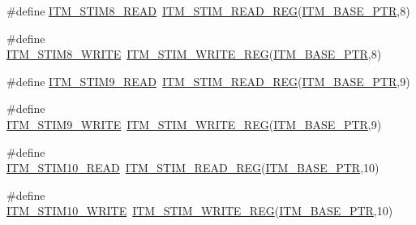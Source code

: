 \begin{DoxyCompactItemize}
\item 
\#define \hyperlink{group___i_t_m___register___accessor___macros_ga84e344ea9bb6dd044130f918d1cd3f59}{I\+T\+M\+\_\+\+S\+T\+I\+M8\+\_\+\+R\+E\+AD}~\hyperlink{group___i_t_m___register___accessor___macros_ga5009882336aadcd4f37b45cf3395c450}{I\+T\+M\+\_\+\+S\+T\+I\+M\+\_\+\+R\+E\+A\+D\+\_\+\+R\+EG}(\hyperlink{group___i_t_m___peripheral_gafaddee8fe8b6a898d4e5edc43ee0d703}{I\+T\+M\+\_\+\+B\+A\+S\+E\+\_\+\+P\+TR},8)
\item 
\#define \hyperlink{group___i_t_m___register___accessor___macros_ga90288fe5645ad72d65bcf25a4e48cc23}{I\+T\+M\+\_\+\+S\+T\+I\+M8\+\_\+\+W\+R\+I\+TE}~\hyperlink{group___i_t_m___register___accessor___macros_ga049ca92a4e78e77c19af81e51aa73f1c}{I\+T\+M\+\_\+\+S\+T\+I\+M\+\_\+\+W\+R\+I\+T\+E\+\_\+\+R\+EG}(\hyperlink{group___i_t_m___peripheral_gafaddee8fe8b6a898d4e5edc43ee0d703}{I\+T\+M\+\_\+\+B\+A\+S\+E\+\_\+\+P\+TR},8)
\item 
\#define \hyperlink{group___i_t_m___register___accessor___macros_ga1c080ae3f53ea5063b86fd6fe6ba264d}{I\+T\+M\+\_\+\+S\+T\+I\+M9\+\_\+\+R\+E\+AD}~\hyperlink{group___i_t_m___register___accessor___macros_ga5009882336aadcd4f37b45cf3395c450}{I\+T\+M\+\_\+\+S\+T\+I\+M\+\_\+\+R\+E\+A\+D\+\_\+\+R\+EG}(\hyperlink{group___i_t_m___peripheral_gafaddee8fe8b6a898d4e5edc43ee0d703}{I\+T\+M\+\_\+\+B\+A\+S\+E\+\_\+\+P\+TR},9)
\item 
\#define \hyperlink{group___i_t_m___register___accessor___macros_gaff1a7b2832a1e4ecef1e171dd126fc48}{I\+T\+M\+\_\+\+S\+T\+I\+M9\+\_\+\+W\+R\+I\+TE}~\hyperlink{group___i_t_m___register___accessor___macros_ga049ca92a4e78e77c19af81e51aa73f1c}{I\+T\+M\+\_\+\+S\+T\+I\+M\+\_\+\+W\+R\+I\+T\+E\+\_\+\+R\+EG}(\hyperlink{group___i_t_m___peripheral_gafaddee8fe8b6a898d4e5edc43ee0d703}{I\+T\+M\+\_\+\+B\+A\+S\+E\+\_\+\+P\+TR},9)
\item 
\#define \hyperlink{group___i_t_m___register___accessor___macros_gac52c9a2197fa51dd2395e68ce8f77f21}{I\+T\+M\+\_\+\+S\+T\+I\+M10\+\_\+\+R\+E\+AD}~\hyperlink{group___i_t_m___register___accessor___macros_ga5009882336aadcd4f37b45cf3395c450}{I\+T\+M\+\_\+\+S\+T\+I\+M\+\_\+\+R\+E\+A\+D\+\_\+\+R\+EG}(\hyperlink{group___i_t_m___peripheral_gafaddee8fe8b6a898d4e5edc43ee0d703}{I\+T\+M\+\_\+\+B\+A\+S\+E\+\_\+\+P\+TR},10)
\item 
\#define \hyperlink{group___i_t_m___register___accessor___macros_ga777b8d32021dcda309623609448e4042}{I\+T\+M\+\_\+\+S\+T\+I\+M10\+\_\+\+W\+R\+I\+TE}~\hyperlink{group___i_t_m___register___accessor___macros_ga049ca92a4e78e77c19af81e51aa73f1c}{I\+T\+M\+\_\+\+S\+T\+I\+M\+\_\+\+W\+R\+I\+T\+E\+\_\+\+R\+EG}(\hyperlink{group___i_t_m___peripheral_gafaddee8fe8b6a898d4e5edc43ee0d703}{I\+T\+M\+\_\+\+B\+A\+S\+E\+\_\+\+P\+TR},10)

\end{DoxyCompactItemize}
